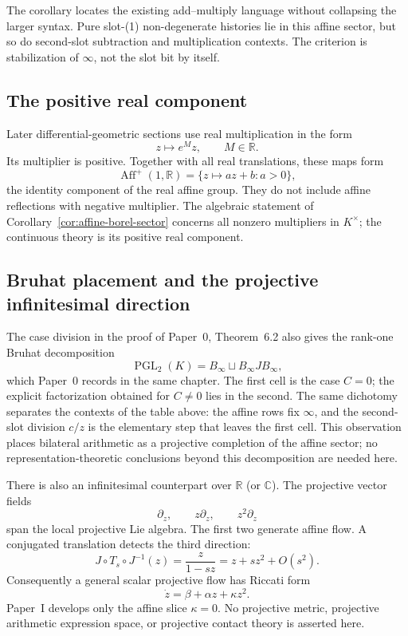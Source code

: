 The corollary locates the existing add--multiply language without collapsing
the larger syntax.  Pure slot-(1) non-degenerate histories lie in this affine
sector, but so do second-slot subtraction and multiplication contexts.  The
criterion is stabilization of $\infty$, not the slot bit by itself.

\subsection{The positive real component}

Later differential-geometric sections use real multiplication in the form
\[
  z\longmapsto e^M z,
  \qquad M\in\mathbb R.
\]
Its multiplier is positive.  Together with all real translations, these maps
form
\[
  \operatorname{Aff}^+(1,\mathbb R)
  =\{z\mapsto az+b:a>0\},
\]
the identity component of the real affine group.  They do not include affine
reflections with negative multiplier.  The algebraic statement of
Corollary~\ref{cor:affine-borel-sector} concerns all nonzero multipliers in
$K^\times$; the continuous theory is its positive real component.

\subsection{Bruhat placement and the projective infinitesimal direction}

The case division in the proof of Paper~0, Theorem~6.2 also gives the rank-one
Bruhat decomposition
\[
  \operatorname{PGL}_2(K)=B_\infty\sqcup B_\infty J B_\infty ,
\]
which Paper~0 records in the same chapter.  The first cell is the case
$C=0$; the explicit factorization obtained for $C\ne0$ lies in the second.  The
same dichotomy separates the contexts of the table above: the affine rows fix
$\infty$, and the second-slot division $c/z$ is the elementary step that leaves
the first cell.  This observation places bilateral arithmetic as a projective
completion of the affine sector; no representation-theoretic conclusions beyond
this decomposition are needed here.

There is also an infinitesimal counterpart over $\mathbb R$ (or $\mathbb C$).
The projective vector fields
\[
  \partial_z,
  \qquad z\partial_z,
  \qquad z^2\partial_z
\]
span the local projective Lie algebra.  The first two generate affine flow.  A
conjugated translation detects the third direction:
\[
  J\circ T_s\circ J^{-1}(z)
  =\frac{z}{1-sz}
  =z+sz^2+O(s^2).
\]
Consequently a general scalar projective flow has Riccati form
\[
  \dot z=\beta+\alpha z+\kappa z^2.
\]
Paper~I develops only the affine slice $\kappa=0$.  No projective metric,
projective arithmetic expression space, or projective contact theory is
asserted here.

